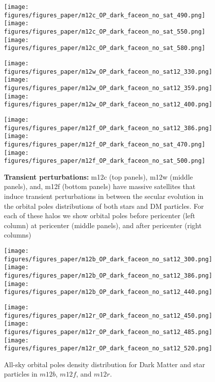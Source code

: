 \documentclass{aastex63}
\begin{document}
\begin{figure*}[H]
    \centering
    
    \texttt{[image: figures/figures\_paper/m12c\_OP\_dark\_faceon\_no\_sat\_490.png]}
    \texttt{[image: figures/figures\_paper/m12c\_OP\_dark\_faceon\_no\_sat\_550.png]}
    \texttt{[image: figures/figures\_paper/m12c\_OP\_dark\_faceon\_no\_sat\_580.png]}

    \texttt{[image: figures/figures\_paper/m12w\_OP\_dark\_faceon\_no\_sat12\_330.png]}
    \texttt{[image: figures/figures\_paper/m12w\_OP\_dark\_faceon\_no\_sat12\_359.png]}
    \texttt{[image: figures/figures\_paper/m12w\_OP\_dark\_faceon\_no\_sat12\_400.png]}

    \texttt{[image: figures/figures\_paper/m12f\_OP\_dark\_faceon\_no\_sat12\_386.png]}
    \texttt{[image: figures/figures\_paper/m12f\_OP\_dark\_faceon\_no\_sat\_470.png]}
    \texttt{[image: figures/figures\_paper/m12f\_OP\_dark\_faceon\_no\_sat\_500.png]}

   

    \caption{\textbf{Transient perturbations:} m12c (top panels), m12w (middle panels), and, m12f (bottom panels) have massive satellites that induce transient perturbations in between the secular evolution in the orbital poles distributions of both stars and DM particles. For each of these halos we show orbital poles before pericenter (left column) at pericenter (middle panels), and after pericenter (right columns) }
    \label{fig:my_label}
\end{figure*}



\begin{figure*}[H]
    \centering
    \texttt{[image: figures/figures\_paper/m12b\_OP\_dark\_faceon\_no\_sat12\_300.png]}
    \texttt{[image: figures/figures\_paper/m12b\_OP\_dark\_faceon\_no\_sat12\_386.png]}
    \texttt{[image: figures/figures\_paper/m12b\_OP\_dark\_faceon\_no\_sat12\_440.png]}


    \texttt{[image: figures/figures\_paper/m12r\_OP\_dark\_faceon\_no\_sat12\_450.png]}
    \texttt{[image: figures/figures\_paper/m12r\_OP\_dark\_faceon\_no\_sat12\_485.png]}
    \texttt{[image: figures/figures\_paper/m12r\_OP\_dark\_faceon\_no\_sat12\_520.png]}

    \caption{All-sky orbital poles density distribution for Dark Matter and star particles in $m12b$, $m12f$, and $m12r$.}
    \label{fig:my_label}
\end{figure*}
\end{document}
